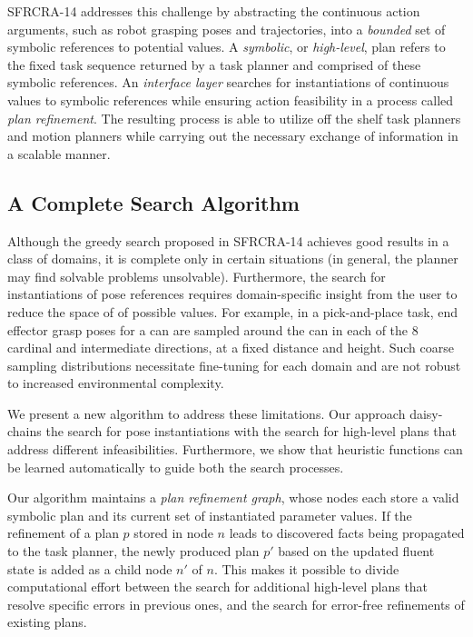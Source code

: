 SFRCRA-14 addresses this challenge by abstracting the continuous action
arguments, such as robot grasping poses and trajectories, into a
\emph{bounded} set of symbolic references to potential values. A
\emph{symbolic}, or \emph{high-level}, plan refers to the fixed task
sequence returned by a task planner and comprised of these symbolic
references.  An \emph{interface layer} searches for instantiations of
continuous values to symbolic references while ensuring action
feasibility in a process called \emph{plan refinement}. The resulting
process is able to utilize off the shelf task planners and motion
planners while carrying out the necessary exchange of information in a
scalable manner.

\subsection{A Complete Search Algorithm}
Although the greedy search proposed in SFRCRA-14 achieves good results
in a class of domains, it is complete only in certain situations (in
general, the planner may find solvable problems
unsolvable). Furthermore, the search for instantiations of pose
references requires domain-specific insight from the user to reduce
the space of of possible values.  For example, in a pick-and-place
task, end effector grasp poses for a can are sampled around the can in
each of the 8 cardinal and intermediate directions, at a fixed
distance and height.  Such coarse sampling distributions necessitate
fine-tuning for each domain and are not robust to increased
environmental complexity.

We present a new algorithm to address these limitations. Our approach
daisy-chains the search for pose instantiations with the search for
high-level plans that address different infeasibilities. Furthermore,
we show that heuristic functions can be learned automatically to guide
both the search processes. 


Our algorithm maintains a \emph{plan refinement graph}, whose
nodes each store a valid symbolic plan and its current set of
instantiated parameter values. If the refinement of a plan $p$ stored in
node $n$ leads to discovered facts being propagated to the task
planner, the newly produced plan $p'$ based on the updated fluent
state is added as a child node $n'$ of $n$. This makes it possible to
divide computational effort between the search for additional
high-level plans that resolve specific errors in previous ones, and
the search for error-free refinements of existing plans.

